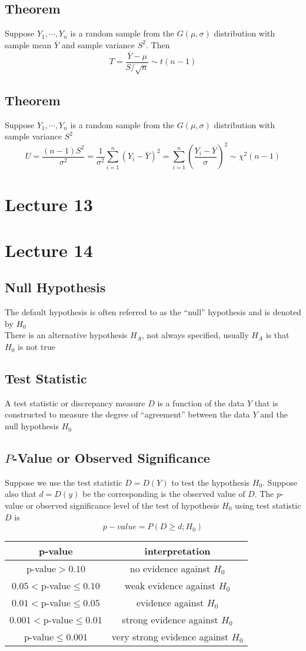 \documentclass[11pt]{article}
\begin{document}
\subsection{Theorem}
Suppose $Y_1,\cdots,Y_n$ is a random sample from the $G(\mu,\sigma)$ distribution with sample mean $\overline{Y}$ and sample variance $S^2$. Then 
\[T = \frac{\overline{Y}-\mu}{S/\sqrt{n}}\sim t(n-1)\]
\subsection{Theorem}
Suppose $Y_1,\cdots,Y_n$ is a random sample from the $G(\mu,\sigma)$ distribution with sample variance $S^2$
\[U = \dfrac{(n-1)S^2}{\sigma^2} = \frac{1}{\sigma^2}\sum_{i=1}^{n}(Y_i-\overline{Y})^2 = \sum_{i=1}^{n}(\frac{Y_i-\overline{Y}}{\sigma})^2\sim \chi^2(n-1)\]

\section{Lecture 13}

\section{Lecture 14}
\subsection{Null Hypothesis}
The default hypothesis is often referred to as the ``null'' hypothesis and is denoted by $H_0$ \\
There is an alternative hypothesis $H_A$, not always specified, usually $H_A$ is that $H_0$ is not true
\subsection{Test Statistic}
A test statistic or discrepancy measure $D$ is a function of the data $Y$ that is constructed to measure the degree of ``agreement'' between the data $Y$ and the null hypothesis $H_0$
\subsection{$P$-Value or Observed Significance}
Suppose we use the test statistic $D=D(Y)$ to test the hypothesis $H_0$. Suppose also that $d=D(y)$ be the corresponding is the observed value of $D$. The $p$-value or observed significance level of the test of hypothesis $H_0$ using test statistic $D$ is 
\[p-value = P(D\geq d;H_0)\]
\begin{center}
\begin{tabular}{c|c}
  p-value &interpretation \\ \hline
  p-value$ >0.10$ &no evidence against $H_0$ \\ \hline 
  $0.05 < $p-value$ \leq0.10$ &weak evidence against $H_0$ \\ \hline 
  $0.01 < $p-value$ \leq0.05$ &evidence against $H_0$ \\ \hline 
  $0.001 < $p-value$ \leq0.01$ &strong evidence against $H_0$ \\ \hline 
  p-value$ \leq 0.001$ &very strong evidence against $H_0$
\end{tabular}
\end{center}
\end{document}
